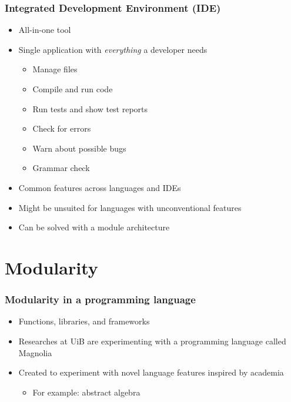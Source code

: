 \begin{frame}
  \frametitle{Integrated Development Environment (IDE)}
  \begin{itemize}
    \item All-in-one tool
    \item Single application with \textit{everything} a developer needs
      \begin{itemize}
        \item Manage files
        \item Compile and run code
        \item Run tests and show test reports
        \item Check for errors
        \item Warn about possible bugs
        \item Grammar check
      \end{itemize}
    \item Common features across languages and IDEs
    \item Might be unsuited for languages with unconventional features
    \item Can be solved with a module architecture
  \end{itemize}
\end{frame}

\section{Modularity}
\SectionPage

\begin{frame}
  \frametitle{Modularity in a programming language}
  \begin{itemize}
    \item Functions, libraries, and frameworks
    \item Researches at UiB are experimenting with a programming language
    called Magnolia
    \item Created to experiment with novel language features inspired by
    academia
      \begin{itemize}
        \item For example: abstract algebra
      \end{itemize}
  \end{itemize}
\end{frame}


